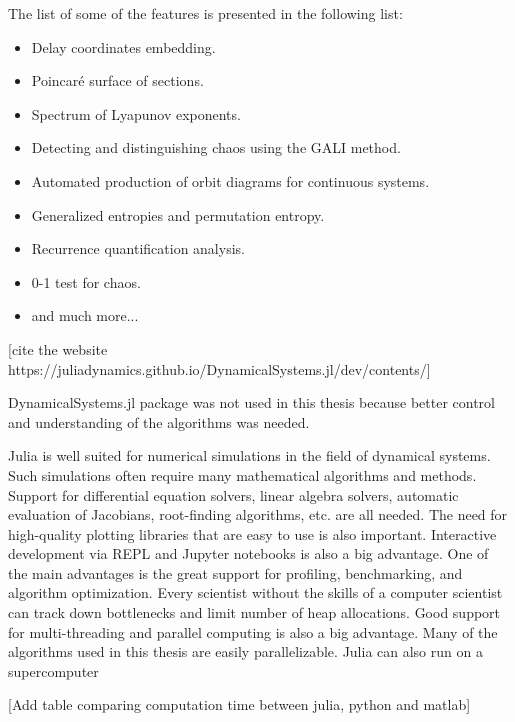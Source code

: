The list of some of the features is presented in the following list:
\begin{itemize}
    \item Delay coordinates embedding.
    \item Poincaré surface of sections.
    \item Spectrum of Lyapunov exponents.
    \item Detecting and distinguishing chaos using the GALI method.
    \item Automated production of orbit diagrams for continuous systems.
    \item Generalized entropies and permutation entropy.
    \item Recurrence quantification analysis.
    \item 0-1 test for chaos.
    \item and much more...
\end{itemize} [cite the website https://juliadynamics.github.io/DynamicalSystems.jl/dev/contents/]

DynamicalSystems.jl package was not used in this thesis because better control and understanding of the algorithms was needed.
\par
Julia is well suited for numerical simulations in the field of dynamical systems.
Such simulations often require many mathematical algorithms and methods.
Support for differential equation solvers, linear algebra solvers, automatic evaluation of Jacobians, root-finding algorithms, etc. are all needed.
The need for high-quality plotting libraries that are easy to use is also important.
Interactive development via REPL and Jupyter notebooks is also a big advantage.
One of the main advantages is the great support for profiling, benchmarking, and algorithm optimization.
Every scientist without the skills of a computer scientist can track down bottlenecks and limit number of heap allocations.
Good support for multi-threading and parallel computing is also a big advantage.
Many of the algorithms used in this thesis are easily parallelizable.
Julia can also run on a supercomputer~\cite{Regier2016-vq}

[Add table comparing computation time between julia, python and matlab]

